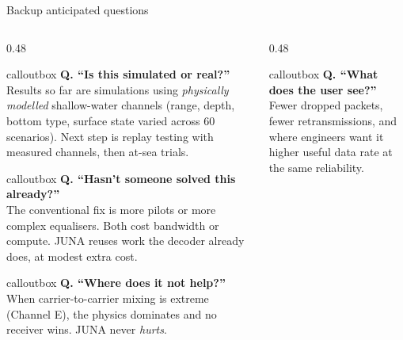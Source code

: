 \documentclass[aspectratio=169,10pt]{beamer}
\begin{document}
\appendix

\begin{frame}{Backup \textendash{} anticipated questions}
  \footnotesize
  \begin{columns}[T,onlytextwidth]
    \begin{column}{0.48\textwidth}
      \begin{beamercolorbox}[wd=\linewidth,sep=6pt,rounded=true]{calloutbox}
        \textbf{Q. ``Is this simulated or real?''}\\
        Results so far are simulations using \emph{physically modelled} shallow-water channels (range, depth, bottom type, surface state varied across 60 scenarios). Next step is replay testing with measured channels, then at-sea trials.
      \end{beamercolorbox}
      \vspace{0.3em}
      \begin{beamercolorbox}[wd=\linewidth,sep=6pt,rounded=true]{calloutbox}
        \textbf{Q. ``Hasn't someone solved this already?''}\\
        The conventional fix is more pilots or more complex equalisers. Both cost bandwidth or compute. JUNA reuses work the decoder already does, at modest extra cost.
      \end{beamercolorbox}
      \vspace{0.3em}
      \begin{beamercolorbox}[wd=\linewidth,sep=6pt,rounded=true]{calloutbox}
        \textbf{Q. ``Where does it not help?''}\\
        When carrier-to-carrier mixing is extreme (Channel E), the physics dominates and no receiver wins. JUNA never \emph{hurts}.
      \end{beamercolorbox}
    \end{column}
    \begin{column}{0.48\textwidth}
      \begin{beamercolorbox}[wd=\linewidth,sep=6pt,rounded=true]{calloutbox}
        \textbf{Q. ``What does the user see?''}\\
        Fewer dropped packets, fewer retransmissions, and \textendash{} where engineers want it \textendash{} higher useful data rate at the same reliability.
      \end{beamercolorbox}
      \vspace{0.3em}

\end{column}
\end{columns}
\end{frame}
\end{document}
